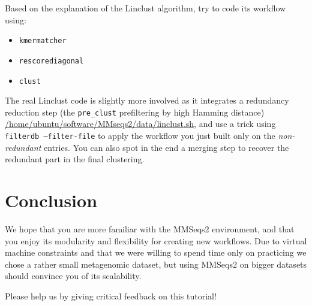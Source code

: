 \documentclass{scrartcl}
\begin{document}
Based on the explanation of the Linclust algorithm, try to code its workflow using:
\begin{itemize}
    \item \texttt{kmermatcher}
    \item \texttt{rescorediagonal}
    \item \texttt{clust}
\end{itemize}

The real Linclust code is slightly more involved as it integrates a redundancy reduction step (the \texttt{pre_clust} prefiltering by high Hamming distance) \url{/home/ubuntu/software/MMseqs2/data/linclust.sh}, and use a trick using \texttt{filterdb --filter-file} to apply the workflow you just built only on the \textit{non-redundant} entries. You can also spot in the end a merging step to recover the redundant part in the final clustering.


\section{Conclusion}

We hope that you are more familiar with the MMSeqs2 environment, and that you enjoy its modularity and flexibility for creating new workflows. Due to virtual machine constraints and that we were willing to spend time only on practicing we chose a rather small metagenomic dataset, but using MMSeqs2 on bigger datasets should convince you of its scalability.

Please help us by giving critical feedback on this tutorial!




\end{document}
